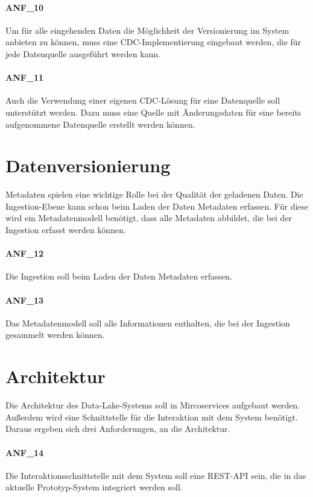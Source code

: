 \paragraph{ANF\_10}
\label{ANF_10}
Um für alle eingehenden Daten die Möglichkeit der Versionierung im System anbieten zu können, muss eine CDC-Implementierung eingebaut werden, die für jede Datenquelle ausgeführt werden kann.

\paragraph{ANF\_11}
\label{ANF_11}
Auch die Verwendung einer eigenen CDC-Lösung für eine Datenquelle soll unterstützt werden.
Dazu muss eine Quelle mit Änderungsdaten für eine bereits aufgenommene Datenquelle erstellt werden können.

\section{Datenversionierung}
\label{sec:anf-metadata}
Metadaten spielen eine wichtige Rolle bei der Qualität der geladenen Daten.
Die Ingestion-Ebene kann schon beim Laden der Daten Metadaten erfassen.
Für diese wird ein Metadatenmodell benötigt, dass alle Metadaten abbildet, die bei der Ingestion erfasst werden können.

\paragraph{ANF\_12}
\label{ANF_12}
Die Ingestion soll beim Laden der Daten Metadaten erfassen.

\paragraph{ANF\_13}
\label{ANF_13}
Das Metadatenmodell soll alle Informationen enthalten, die bei der Ingestion gesammelt werden können.

\section{Architektur}
\label{sec:anf-arch}
Die Architektur des Data-Lake-Systems soll in Mircoservices aufgebaut werden.
Außerdem wird eine Schnittstelle für die Interaktion mit dem System benötigt.
Daraus ergeben sich drei Anforderungen, an die Architektur.

\paragraph{ANF\_14}
\label{ANF_14}
Die Interaktionsschnittstelle mit dem System soll eine REST-API sein, die in das aktuelle Prototyp-System integriert werden soll.

